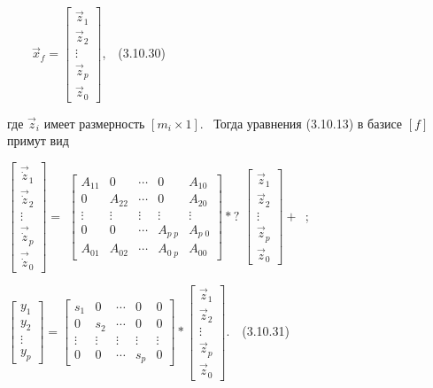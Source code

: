 \documentclass[a4paper]{article}
\newcommand\textsubscript[1]{\ensuremath{{}_{\text{#1}}}}
\begin{document}
{\begin{russian}\sffamily
\ \ \ \  $\vec x_f=\left[\begin{matrix}\vec z_1\\\vec z_2\\\vdots \\\vec z_p\\\vec z_0\end{matrix}\right]$,\ \ (3.10.30)
\end{russian}}

{\begin{russian}\sffamily
где  $\vec z_i$ имеет размерность  $\left[m_i\times 1\right]$. \ Тогда уравнения (3.10.13) в базисе  $[f]$ примут вид
\end{russian}}

{\begin{russian}\sffamily
 $\left[\begin{matrix}\vec{\dot z}_1\\\vec{\dot z}_2\\\vdots \\\vec{\dot z}_p\\\vec{\dot z}_0\end{matrix}\right]=$
$\left[\begin{matrix}A_{11}&0&\cdots &0&A_{10}\\0&A_{22}&\cdots &0&A_{20}\\\vdots &\vdots &\vdots &\vdots &\vdots
\\0&0&\cdots &A_{p\;p}&A_{p\;0}\\A_{01}&A_{02}&\cdots &A_{0\;p}&A_{00}\end{matrix}\right]\ast ?$
$\left[\begin{matrix}\vec z_1\\\vec z_2\\\vdots \\\vec z_p\\\vec
z_0\end{matrix}\right]+$\textrussian{\textrm{\textsubscript{ }}};
\end{russian}}

{\begin{russian}\sffamily
 $\left[\begin{matrix}y_1\\y_2\\\vdots \\y_p\end{matrix}\right]=\left[\begin{matrix}s_1&0&\cdots &0&0\\0&s_2&\cdots
&0&0\\\vdots &\vdots &\vdots &\vdots &\vdots \\0&0&\cdots &s_p&0\end{matrix}\right]\ast \left[\begin{matrix}\vec
z_1\\\vec z_2\\\vdots \\\vec z_p\\\vec z_0\end{matrix}\right]$.\ \ (3.10.31)
\end{russian}}
\end{document}
